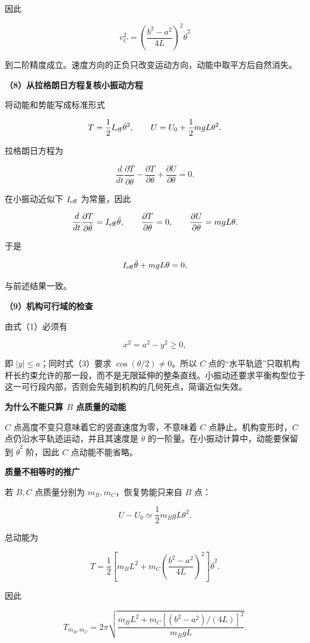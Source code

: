 \documentclass[12pt,a4paper,UTF8]{ctexart}
\begin{document}
因此

\[
v_C^2=\left(\frac{b^2-a^2}{4L}\right)^2\dot\theta^2
\]

到二阶精度成立。速度方向的正负只改变运动方向，动能中取平方后自然消失。

\textbf{（8）从拉格朗日方程复核小振动方程}

将动能和势能写成标准形式

\[
T=\frac12I_{\rm eff}\dot\theta^2,
\qquad
U=U_0+\frac12mgL\theta^2.
\]

拉格朗日方程为

\[
\frac d{dt}\frac{\partial T}{\partial\dot\theta}
-\frac{\partial T}{\partial\theta}
+\frac{\partial U}{\partial\theta}=0.
\]

在小振动近似下 \(I_{\rm eff}\) 为常量，因此

\[
\frac d{dt}\frac{\partial T}{\partial\dot\theta}
=I_{\rm eff}\ddot\theta,
\qquad
\frac{\partial T}{\partial\theta}=0,
\qquad
\frac{\partial U}{\partial\theta}=mgL\theta.
\]

于是

\[
I_{\rm eff}\ddot\theta+mgL\theta=0,
\]

与前述结果一致。

\textbf{（9）机构可行域的检查}

由式（1）必须有

\[
x^2=a^2-y^2\geq0,
\]

即 \(|y|\leq a\)；同时式（3）要求 \(\cos(\theta/2)\ne0\)。所以 \(C\)
点的``水平轨迹''只取机构杆长约束允许的那一段，而不是无限延伸的整条直线。小振动还要求平衡构型位于这一可行段内部，否则会先碰到机构的几何死点，简谐近似失效。

\textbf{为什么不能只算 \(B\) 点质量的动能}

\(C\) 点高度不变只意味着它的竖直速度为零，不意味着 \(C\)
点静止。机构变形时，\(C\) 点仍沿水平轨迹运动，并且其速度是
\(\dot\theta\) 的一阶量。在小振动计算中，动能要保留到 \(\dot\theta^2\)
阶，因此 \(C\) 点动能不能省略。

\textbf{质量不相等时的推广}

若 \(B,C\) 点质量分别为 \(m_B,m_C\)，恢复势能只来自 \(B\) 点：

\[
U-U_0\simeq\frac12m_BgL\theta^2.
\]

总动能为

\[
T=\frac12\left[
m_BL^2+m_C\left(\frac{b^2-a^2}{4L}\right)^2
\right]\dot\theta^2.
\]

因此

\[
T_{m_B,m_C}=2\pi\sqrt{
\frac{m_BL^2+m_C[(b^2-a^2)/(4L)]^2}
{m_BgL}}
.
\]
\end{document}
